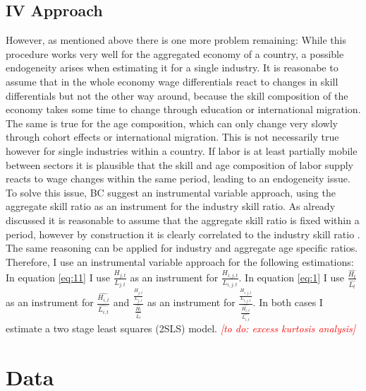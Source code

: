 \documentclass[]{article}
\begin{document}
\subsection{IV Approach}
However, as mentioned above there is one more problem remaining: While
this procedure works very well for the aggregated economy of a
country, a possible endogeneity arises when estimating it for a single
industry. It is reasonabe to assume that in the whole economy wage
differentials react to changes in skill differentials but not the
other way around, because the skill composition of the economy takes
some time to change through education or international migration. The
same is true for the age composition, which can only change very
slowly through cohort effects or international migration. This is not
necessarily true however for single industries within a country. If
labor is at least partially mobile between sectors it is plausible
that the skill and age composition of labor supply reacts to wage
changes within the same period, leading to an endogeneity issue. To
solve this issue, BC suggest an instrumental variable approach, using
the aggregate skill ratio as an instrument for the industry skill
ratio. As already discussed it is reasonable to assume that the
aggregate skill ratio is fixed within a period, however by
construction it is clearly correlated to the industry skill ratio
. The same reasoning can be applied for industry and aggregate age
specific ratios. Therefore, I use an instrumental variable approach
for the following estimations: In equation \eqref{eq:11} I use
$\frac{H_{j,t}}{L_{j,t}}$ as an instrument for
$\frac{H_{i,j,t}}{L_{i,j,t}}$. In equation \eqref{eq:1} I use
$\frac{\widehat{H_{t}}}{\widehat{L_{t}}}$ as an instrument for
$\frac{\widehat{H_{i,t}}}{\widehat{L_{i,t}}}$ and
$\frac{\frac{H_{j,t}}{L_{j,t}}}{\frac{\widehat{H_{t}}}{\widehat{L_{t}}}}$
as an instrument for
$\frac{\frac{H_{i,j,t}}{L_{i,j,t}}}{\frac{\widehat{H_{i,t}}}{\widehat{L_{i,t}}}}$. In
both cases I estimate a two stage least squares (2SLS)
model. \textcolor{red}{\emph{[to do: excess kurtosis analysis]}}
\section{Data}
\end{document}

